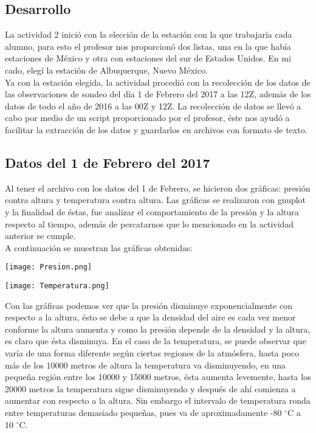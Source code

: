 \documentclass[12pt]{article}
\begin{document}
\begin{doublespace}
\section{Desarrollo}
La actividad 2 inició con la elección de la estación con la que trabajaría cada alumno, para esto el profesor nos proporcionó dos listas, una en la que había estaciones de México y otra con estaciones del sur de Estados Unidos. En mi cado, elegí la estación de Albuquerque, Nuevo México.
\\

Ya con la estación elegida, la actividad procedió con la recolección de los datos de las observaciones de sondeo del día 1 de Febrero del 2017 a las 12Z, además de los datos de todo el año de 2016 a las 00Z y 12Z. La recolección de datos se llevó a cabo por medio de un script proporcionado por el profesor, éste nos ayudó a facilitar la extracción de los datos y guardarlos en archivos con formato de texto. 

\subsection{Datos del 1 de Febrero del 2017}
Al tener el archivo con los datos del 1 de Febrero, se hicieron dos gráficas: presión contra altura y temperatura contra altura. Las gráficas se realizaron con gnuplot y la finalidad de éstas, fue analizar el comportamiento de la presión y la altura respecto al tiempo, además de percatarnos que lo mencionado en la actividad anterior se cumple.
\\

A continuación se muestran las gráficas obtenidas:
\\
\begin{center}
\texttt{[image: Presion.png]}
\vspace{1.5 cm}

\texttt{[image: Temperatura.png]}
\end{center}
\pagebreak

Con las gráficas podemos ver que la presión disminuye exponencialmente con respecto a la altura, ésto se debe a que la densidad del aire es cada vez menor conforme la altura aumenta y como la presión depende de la densidad y la altura, es claro que ésta disminuya. En el caso de la temperatura, se puede observar que varía de una forma diferente según ciertas regiones de la atmósfera, hasta poco más de los 10000 metros de altura la temperatura va disminuyendo, en una pequeña región entre los 10000 y 15000 metros, ésta aumenta levemente, hasta los 20000 metros la temperatura sigue disminuyendo y después de ahí comienza a aumentar con respecto a la altura. Sin embargo el intervalo de temperatura ronda entre temperaturas demasiado pequeñas, pues va de aproximadamente -80 $^{\circ}$C a 10 $^{\circ}$C. 


\end{doublespace}
\end{document}
